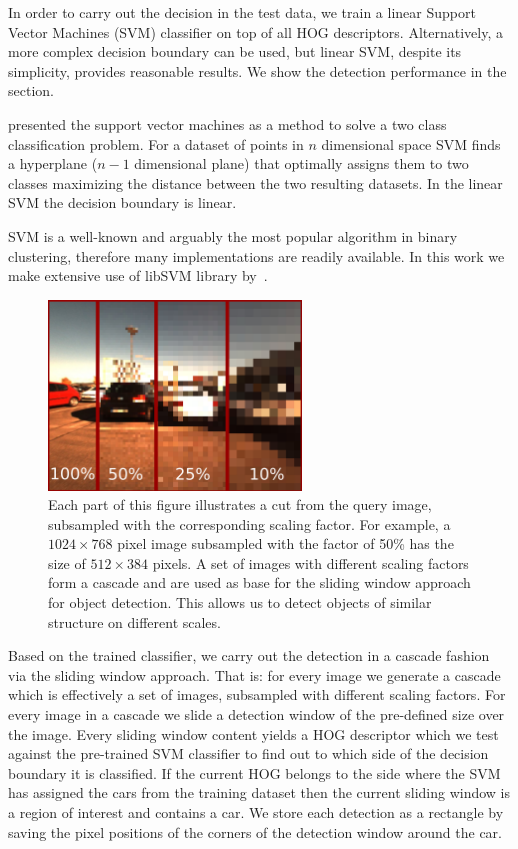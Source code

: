 In order to carry out the decision in the test data, we train a linear Support
Vector Machines (SVM) classifier on top of all HOG descriptors. Alternatively,
a more complex decision boundary can be used, but linear SVM, despite its
simplicity, provides reasonable results. We show the detection performance in
the  section.

\citet{svm} presented the support vector machines as a method to solve a two
class classification problem. For a dataset of points in $n$ dimensional space
SVM finds a hyperplane ($n-1$ dimensional plane) that optimally assigns them
to two classes maximizing the distance between the two resulting datasets. In
the linear SVM the decision boundary is linear.

SVM is a well-known and arguably the most popular algorithm in binary
clustering, therefore many implementations are readily available. In this work
we make extensive use of libSVM library by~\citet{libSVM2011}.

\begin{figure}[t]
    \begin{center}
        \includegraphics[width=0.6\textwidth]{pictures/cascades.png}
    \end{center}
    \caption{Each part of this figure illustrates a cut from the query image, subsampled with the corresponding scaling factor. For example, a $1024 \times 768$ pixel image subsampled with the factor of 50\% has the size of $512 \times 384$ pixels. A set of images with different scaling factors form a cascade and are used as base for the sliding window approach for object detection. This allows us to detect objects of similar structure on different scales.}
    \label{fig:cascades}
\end{figure}

Based on the trained classifier, we carry out the detection in a cascade
fashion via the sliding window approach. That is: for every image we generate
a cascade which is effectively a set of images, subsampled with different
scaling factors. For every image in a cascade we slide a detection window of
the pre-defined size over the image. Every sliding window content yields a HOG
descriptor which we test against the pre-trained SVM classifier to find out to
which side of the decision boundary it is classified. If the current HOG
belongs to the side where the SVM has assigned the cars from the training
dataset then the current sliding window is a region of interest and contains a
car. We store each detection as a rectangle by saving the pixel positions of
the corners of the detection window around the car.

